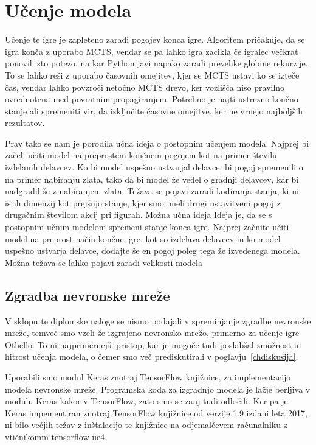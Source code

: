 \documentclass[a4paper, 12pt]{book}
\begin{document}
\chapter{Učenje modela}
\label{chucenjemodela}

Učenje te igre je zapleteno zaradi pogojev konca igre. Algoritem pričakuje, da se igra konča z uporabo MCTS, vendar se pa lahko igra zacikla če igralec večkrat ponovil isto potezo, na kar Python javi napako zaradi prevelike globine rekurzije.
To se lahko reši z uporabo časovnih omejitev, kjer se MCTS ustavi ko se izteče čas, vendar lahko povzroči netočno MCTS drevo, ker vozlišča niso pravilno ovrednotena med povratnim propagiranjem.
Potrebno je najti ustrezno končno stanje ali spremeniti vir, da izključite časovne omejitve, ker ne vrnejo najboljših rezultatov.

Prav tako se nam je porodila učna ideja o postopnim učenjem modela. Najprej bi začeli učiti model na preprostem končnem pogojem kot na primer številu izdelanih delavcev. Ko bi model uspešno ustvarjal delavce, bi pogoj spremenili o na primer nabiranju zlata, tako da bi model že vedel o gradnji delavcev, kar bi nadgradil še z nabiranjem zlata. Težava se pojavi zaradi kodiranja stanja, ki ni istih dimenzij kot prejšnjo stanje, kjer smo imeli drugi ustavitveni pogoj z drugačnim številom akcij pri figurah.
Možna učna ideja
Ideja je, da se s postopnim učnim modelom spremeni stanje konca igre. Najprej začnite učiti model na preprost način končne igre, kot so izdelava delavcev in ko model uspešno ustvarja delavce, dodajte še en pogoj poleg tega že izvedenega modela.
Možna težava se lahko pojavi zaradi velikosti modela

\section{Zgradba nevronske mreže}

V sklopu te diplomske naloge se nismo podajali v spreminjanje zgradbe nevronske mreže, temveč smo vzeli že izgrajeno nevronsko mrežo, primerno za učenje igre Othello.
To ni najprimernejši pristop, kar je mogoče tudi poslabšal zmožnost in hitrost učenja modela, o čemer smo več prediskutirali v poglavju~\ref{chdiskusija}.

Uporabili smo modul Keras znotraj TensorFlow knjižnice, za implementacijo modela nevronske mreže.
Programska koda za izgradnjo modela je lažje berljiva v modulu Keras kakor v TensorFlow, zato smo se zanj tudi odločili.
Ker pa je Keras impementiran znotraj TensorFlow knjižnice od verzije 1.9 izdani leta 2017, ni bilo večjih težav z inštalacijo te knjižnice na odjemalčevem računalniku z vtičnikomm tensorflow-ue4.
\end{document}
